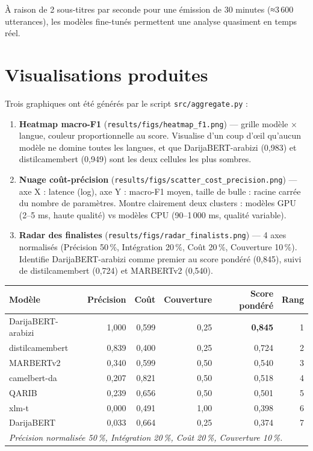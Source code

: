 \documentclass[12pt, a4paper]{article}
\begin{document}
À raison de 2 sous-titres par seconde pour une émission de 30 minutes
(≈3\,600 utterances), les modèles fine-tunés permettent une analyse
quasiment en temps réel.

\section{Visualisations produites}

Trois graphiques ont été générés par le script \texttt{src/aggregate.py} :

\begin{enumerate}
  \item \textbf{Heatmap macro-F1} (\texttt{results/figs/heatmap\_f1.png}) —
    grille modèle × langue, couleur proportionnelle au score. Visualise d'un coup
    d'œil qu'aucun modèle ne domine toutes les langues, et que DarijaBERT-arabizi
    (0{,}983) et distilcamembert (0{,}949) sont les deux cellules les plus sombres.

  \item \textbf{Nuage coût-précision} (\texttt{results/figs/scatter\_cost\_precision.png}) —
    axe X : latence (log), axe Y : macro-F1 moyen, taille de bulle : racine carrée
    du nombre de paramètres. Montre clairement deux clusters : modèles GPU
    (2--5 ms, haute qualité) vs modèles CPU (90--1\,000 ms, qualité variable).

  \item \textbf{Radar des finalistes} (\texttt{results/figs/radar\_finalists.png}) —
    4 axes normalisés (Précision 50\,\%, Intégration 20\,\%, Coût 20\,\%, Couverture 10\,\%).
    Identifie DarijaBERT-arabizi comme premier au score pondéré (0{,}845),
    suivi de distilcamembert (0{,}724) et MARBERTv2 (0{,}540).
\end{enumerate}

\begin{center}
\begin{tabular}{lrrrrr}
\toprule
\textbf{Modèle} & \textbf{Précision} & \textbf{Coût} & \textbf{Couverture} &
\textbf{Score pondéré} & \textbf{Rang} \\
\midrule
DarijaBERT-arabizi & 1{,}000 & 0{,}599 & 0{,}25 & \textbf{0{,}845} & 1 \\
distilcamembert    & 0{,}839 & 0{,}400 & 0{,}25 & 0{,}724 & 2 \\
MARBERTv2          & 0{,}340 & 0{,}599 & 0{,}50 & 0{,}540 & 3 \\
camelbert-da       & 0{,}207 & 0{,}821 & 0{,}50 & 0{,}518 & 4 \\
QARIB              & 0{,}239 & 0{,}656 & 0{,}50 & 0{,}501 & 5 \\
xlm-t              & 0{,}000 & 0{,}491 & 1{,}00 & 0{,}398 & 6 \\
DarijaBERT         & 0{,}033 & 0{,}664 & 0{,}25 & 0{,}374 & 7 \\
\bottomrule
\multicolumn{6}{l}{\small\textit{Précision normalisée 50\,\%, Intégration 20\,\%, Coût 20\,\%, Couverture 10\,\%.}}
\end{tabular}
\end{center}
\end{document}
